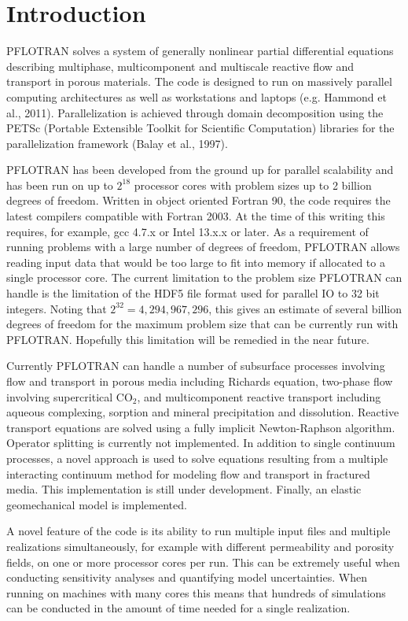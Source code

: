 
\section{Introduction}

PFLOTRAN solves a system of generally nonlinear partial differential equations describing multiphase, multicomponent and multiscale reactive flow and transport in porous materials. The code is designed to run on massively parallel computing architectures as well as workstations and laptops (e.g. Hammond et al., 2011). Parallelization is achieved through domain decomposition using the PETSc (Port\-a\-ble Extensible Toolkit for Scientific Computation) libraries for the parallelization framework (Balay et al., 1997). 

PFLOTRAN has been developed from the ground up for parallel scalability and has been run on up to $2^{18}$ processor cores with problem sizes up to 2 billion degrees of freedom. Written in object oriented Fortran 90, the code requires the latest compilers compatible with Fortran 2003. At the time of this writing this requires, for example, gcc 4.7.x or Intel 13.x.x or later. %
As a requirement of running problems with a large number of degrees of freedom, PFLOTRAN allows reading input data that would be too large to fit into memory if allocated to a single processor core. The current limitation to the problem size PFLOTRAN can handle is the limitation of the HDF5 file format used for parallel IO to 32 bit integers. Noting that $2^{32} = 4,294,967,296$, this gives an estimate of several billion degrees of freedom for the maximum problem size that can be currently run with PFLOTRAN. Hopefully this limitation will be remedied in the near future.

Currently PFLOTRAN can handle a number of subsurface processes involving flow and transport in porous media including Richards equation, two-phase flow involving supercritical CO$_2$, and multicomponent reactive transport including aqueous complexing, sorption and mineral precipitation and dissolution. Reactive transport equations are solved using a fully implicit Newton-Raphson algorithm.
Operator splitting is currently not implemented. In addition to single continuum processes, a novel approach is used to solve equations resulting from a multiple interacting continuum method for modeling flow and transport in fractured media. This implementation is still under development. Finally, an elastic geomechanical model is implemented.

A novel feature of the code is its ability to run multiple input files and multiple realizations simultaneously, for example with different permeability and porosity fields, on one or more processor cores per run. This can be extremely useful when conducting sensitivity analyses and quantifying model uncertainties. When running on machines with many cores this means that hundreds of simulations can be conducted in the amount of time needed for a single realization.

